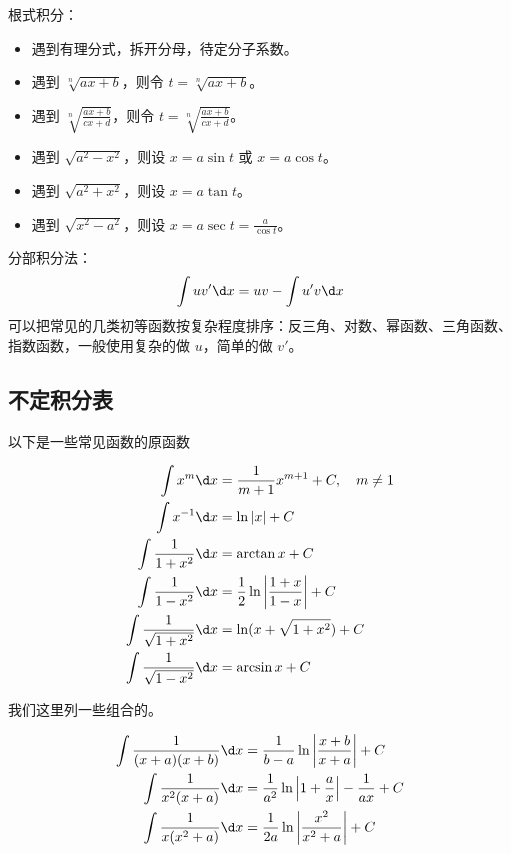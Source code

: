 根式积分：

\begin{itemize}
	\item 遇到有理分式，拆开分母，待定分子系数。
	\item 遇到 $\sqrt[n]{ax+b}$，则令 $t = \sqrt[n]{ax+b}$。
	\item 遇到 $\sqrt[n]{\frac{ax+b}{cx+d}}$，则令 $t = \sqrt[n]{\frac{ax+b}{cx+d}}$。
	\item 遇到 $\sqrt{a^2 - x^2}$，则设 $x = a\sin t$ 或 $x = a\cos t$。
	\item 遇到 $\sqrt{a^2 + x^2}$，则设 $x = a \tan t$。
	\item 遇到 $\sqrt{x^2 - a^2}$，则设 $x = a \sec t = \frac{a}{\cos t}$。
\end{itemize}

分部积分法：
\[ \int u v' \d x = u v - \int u' v \d x \]
可以把常见的几类初等函数按复杂程度排序：反三角、对数、幂函数、三角函数、指数函数，一般使用复杂的做 $u$，简单的做 $v'$。

\subsection{不定积分表}

以下是一些常见函数的原函数

\[ \begin{aligned}
		\int {x}^{m} \d x                  & = \frac{1}{m + 1} x^{m+1} + C, \quad m \neq 1        \\
		\int x^{-1} \d x                   & = \ln |x| + C                                        \\
		\int \frac{1}{1 + x^2} \d x        & = \arctan x + C                                      \\
		\int \frac{1}{1 - x^2} \d x        & = \frac{1}{2} \ln \left| \frac{1+x}{1-x} \right| + C \\
		\int \frac{1}{\sqrt{1 + x^2}} \d x & = \ln(x+\sqrt{1 + x^2}) + C                          \\
		\int \frac{1}{\sqrt{1 - x^2}} \d x & = \arcsin x + C                                      \\
	\end{aligned} \]

我们这里列一些组合的。



\begin{example}[有理式]
	\[ \begin{aligned}
			\int \frac{1}{(x+a)(x+b)} \d x & = \frac{1}{b-a} \ln \left| \frac{x+b}{x+a} \right| + C                \\
			\int \frac{1}{x^2(x+a)}   \d x & = \frac{1}{a^2} \ln \left| 1 + \frac{a}{x} \right| - \frac{1}{ax} + C \\
			\int \frac{1}{x(x^2+a)}   \d x & = \frac{1}{2a} \ln \left| \frac{x^2}{x^2+a}\right| + C
		\end{aligned} \]
\end{example}

